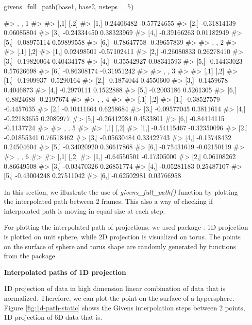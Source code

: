 \begin{Schunk}
\begin{Sinput}
givens_full_path(base1, base2, nsteps = 5)
\end{Sinput}
\begin{Soutput}
#> , , 1
#> 
#>             [,1]        [,2]
#> [1,]  0.24406482 -0.57724655
#> [2,] -0.31814139  0.06085804
#> [3,] -0.24334450  0.38323969
#> [4,] -0.39166263  0.01182949
#> [5,] -0.08975114  0.59899558
#> [6,] -0.78647758 -0.39657839
#> 
#> , , 2
#> 
#>             [,1]        [,2]
#> [1,]  0.02498501 -0.57102411
#> [2,] -0.26080833  0.26278410
#> [3,] -0.19820064  0.40434178
#> [4,] -0.35542927  0.08341593
#> [5,] -0.14433023  0.57626698
#> [6,] -0.86308174 -0.31951242
#> 
#> , , 3
#> 
#>            [,1]       [,2]
#> [1,] -0.1909937 -0.5290164
#> [2,] -0.1874044  0.4550600
#> [3,] -0.1459678  0.4046873
#> [4,] -0.2970111  0.1522888
#> [5,] -0.2003186  0.5261305
#> [6,] -0.8824688 -0.2197674
#> 
#> , , 4
#> 
#>             [,1]       [,2]
#> [1,] -0.38527579 -0.4457635
#> [2,] -0.10411664  0.6258684
#> [3,] -0.09577045  0.3811614
#> [4,] -0.22183655  0.2089977
#> [5,] -0.26412984  0.4533801
#> [6,] -0.84414115 -0.1137724
#> 
#> , , 5
#> 
#>             [,1]        [,2]
#> [1,] -0.54115467 -0.32350096
#> [2,] -0.01855341  0.76518462
#> [3,] -0.05630484  0.33422743
#> [4,] -0.13748432  0.24504604
#> [5,] -0.34020920  0.36617868
#> [6,] -0.75431619 -0.02150119
#> 
#> , , 6
#> 
#>             [,1]        [,2]
#> [1,] -0.64550501 -0.17305000
#> [2,]  0.06108262  0.86649508
#> [3,] -0.03470326  0.26851774
#> [4,] -0.05281183  0.25487107
#> [5,] -0.43004248  0.27511042
#> [6,] -0.62502981  0.03766958
\end{Soutput}
\end{Schunk}

In this section, we illustrate the use of \emph{givens\_full\_path()}
function by plotting the interpolated path between 2 frames. This also a
way of checking if interpolated path is moving in equal size at each
step.

For plotting the interpolated path of projections, we used
 package \citep{geozoo}. 1D projection is plotted on
unit sphere, while 2D projection is visualized on torus. The points on
the surface of sphere and torus shape are randomly generated by
functions from the  package.

\textbf{Interpolated paths of 1D projection}

1D projection of data in high dimension linear combination of data that
is normalized. Therefore, we can plot the point on the surface of a
hypersphere. Figure \ref{fig:1d-path-static} shows the Givens
interpolation steps between 2 points, 1D projection of 6D data that is.

